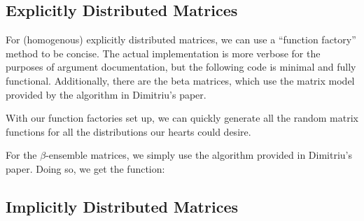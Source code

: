 \subsection{Explicitly Distributed Matrices}

For (homogenous) explicitly distributed matrices, we can use a ``function factory'' method to be concise. The actual implementation is more verbose for the purposes of argument documentation, but the following code is minimal and fully functional. Additionally, there are the beta matrices, which use the matrix model provided by the algorithm in Dimitriu's paper. \newline



With our function factories set up, we can quickly generate all the random matrix functions for all the distributions our hearts could desire.


\newpage



For the $\beta$-ensemble matrices, we simply use the algorithm provided in Dimitriu's paper. Doing so, we get the function:

\newpage
\subsection{Implicitly Distributed Matrices}

